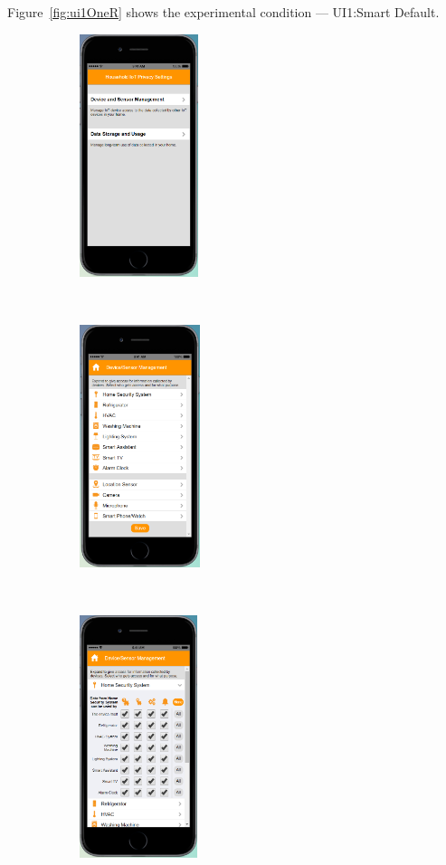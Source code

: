 \begin{appendices}
Figure~\ref{fig:ui1OneR} shows the experimental condition --- UI1:Smart Default.
\begin{figure}
	\centering
	\begin{subfigure}[t]{0.24\textwidth}
		\centering
		\includegraphics[height=2.8in]{figures/ui1sd1.png}
	\end{subfigure}%
	~
	\begin{subfigure}[t]{0.24\textwidth}
		\centering
		\includegraphics[height=2.8in]{figures/ui1sd2.png}
	\end{subfigure}%
	~
	\begin{subfigure}[t]{0.24\textwidth}
		\centering
		\includegraphics[height=2.8in]{figures/ui1sd3.png}

\end{subfigure}
\end{figure}
\end{appendices}
